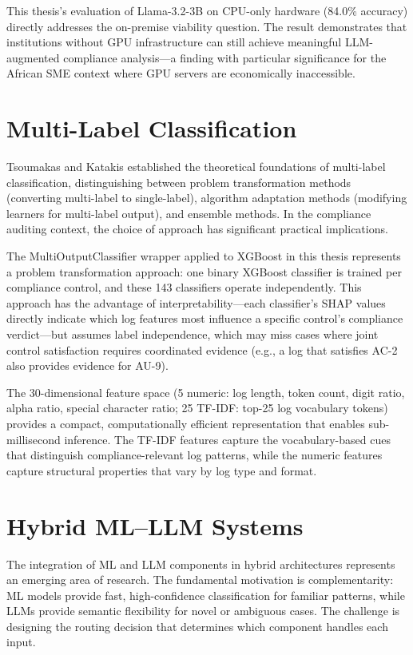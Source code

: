 \documentclass[12pt,oneside]{report}
\begin{document}
This thesis's evaluation of Llama-3.2-3B on CPU-only hardware (84.0\% accuracy) directly addresses the on-premise viability question. The result demonstrates that institutions without GPU infrastructure can still achieve meaningful LLM-augmented compliance analysis—a finding with particular significance for the African SME context where GPU servers are economically inaccessible.

\section{Multi-Label Classification}

Tsoumakas and Katakis \cite{tsoumakas2007} established the theoretical foundations of multi-label classification, distinguishing between problem transformation methods (converting multi-label to single-label), algorithm adaptation methods (modifying learners for multi-label output), and ensemble methods. In the compliance auditing context, the choice of approach has significant practical implications.

The MultiOutputClassifier wrapper applied to XGBoost in this thesis represents a problem transformation approach: one binary XGBoost classifier is trained per compliance control, and these 143 classifiers operate independently. This approach has the advantage of interpretability—each classifier's SHAP values directly indicate which log features most influence a specific control's compliance verdict—but assumes label independence, which may miss cases where joint control satisfaction requires coordinated evidence (e.g., a log that satisfies AC-2 also provides evidence for AU-9).

The 30-dimensional feature space (5 numeric: log length, token count, digit ratio, alpha ratio, special character ratio; 25 TF-IDF: top-25 log vocabulary tokens) provides a compact, computationally efficient representation that enables sub-millisecond inference. The TF-IDF features capture the vocabulary-based cues that distinguish compliance-relevant log patterns, while the numeric features capture structural properties that vary by log type and format.

\section{Hybrid ML--LLM Systems}

The integration of ML and LLM components in hybrid architectures represents an emerging area of research. The fundamental motivation is complementarity: ML models provide fast, high-confidence classification for familiar patterns, while LLMs provide semantic flexibility for novel or ambiguous cases. The challenge is designing the routing decision that determines which component handles each input.
\end{document}
